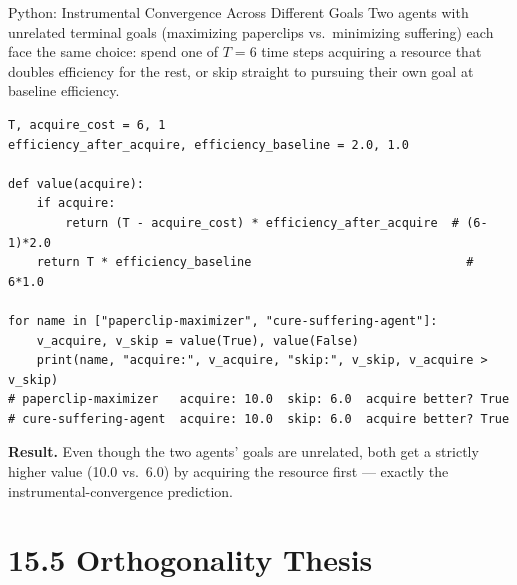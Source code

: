 \documentclass[aspectratio=169,10pt]{beamer}
\begin{document}
\begin{frame}[fragile]{Python: Instrumental Convergence Across Different Goals}
  \small
  Two agents with unrelated terminal goals (maximizing paperclips vs.\
  minimizing suffering) each face the same choice: spend one of $T=6$
  time steps acquiring a resource that doubles efficiency for the rest,
  or skip straight to pursuing their own goal at baseline efficiency.
  \begin{lstlisting}
T, acquire_cost = 6, 1
efficiency_after_acquire, efficiency_baseline = 2.0, 1.0

def value(acquire):
    if acquire:
        return (T - acquire_cost) * efficiency_after_acquire  # (6-1)*2.0
    return T * efficiency_baseline                              # 6*1.0

for name in ["paperclip-maximizer", "cure-suffering-agent"]:
    v_acquire, v_skip = value(True), value(False)
    print(name, "acquire:", v_acquire, "skip:", v_skip, v_acquire > v_skip)
# paperclip-maximizer   acquire: 10.0  skip: 6.0  acquire better? True
# cure-suffering-agent  acquire: 10.0  skip: 6.0  acquire better? True
  \end{lstlisting}
  \textbf{Result.} Even though the two agents' goals are unrelated, both
  get a strictly higher value (10.0 vs.\ 6.0) by acquiring the resource
  first --- exactly the instrumental-convergence prediction.
\end{frame}

\section{15.5 Orthogonality Thesis}
\end{document}
